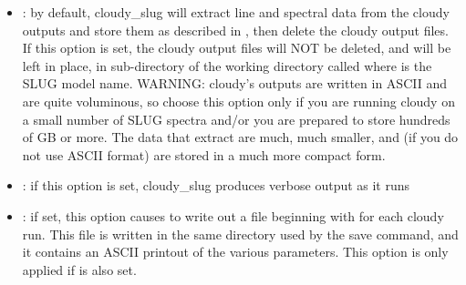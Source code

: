 \documentclass[letterpaper,10pt,english]{sphinxmanual}
\begin{document}
\begin{itemize}
\item {} 
: by default, cloudy\_slug will extract line and
spectral data from the cloudy outputs and store them as described in
{\hyperref[\detokenize{cloudy:ssec-cloudy-output}]{}}, then delete the cloudy output files. If
this option is set, the cloudy output files will NOT be deleted, and
will be left in place, in sub-directory of the working directory
called  where  is the SLUG model
name. WARNING: cloudy’s outputs are written in ASCII and are quite
voluminous, so choose this option only if you are running
cloudy on a small number of SLUG spectra and/or you are prepared to
store hundreds of GB or more. The data that  extract
are much, much smaller, and (if you do not use ASCII format) are
stored in a much more compact form.

\item {} 
: if this option is set, cloudy\_slug produces
verbose output as it runs

\item {} 
: if set, this option causes 
to write out a file beginning with  for each
cloudy run. This file is written in the same directory used by the
save command, and it contains an ASCII printout of the various
parameters. This option is only applied if  is also set.

\end{itemize}
\end{document}
